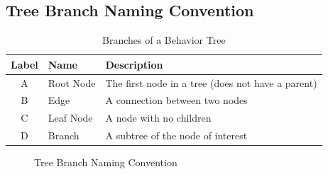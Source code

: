 \documentclass[]{article}
\begin{document}
\clearpage

\subsection{Tree Branch Naming Convention}

\begin{table}[hb]
\begin{center}
\begin{tabular}{|c|l|p{}|}\hline
 \textbf{Label} & \textbf{Name} & \textbf{Description} \\ 
 \hline
 \hline
 A & Root Node & The first node in a tree (does not have a parent)\\ \hline
 B & Edge & A connection between two nodes \\ \hline
 C & Leaf Node & A node with no children \\ \hline
 D & Branch & A subtree of the node of interest \\ \hline
\end{tabular}
\end{center}
\caption{Branches of a Behavior Tree}
\label{BTTree Branches}
\end{table}

\begin{figure}[hb]
 \centering
 \caption{Tree Branch Naming Convention}
 \label{fig:Naming3}
\end{figure}
\end{document}
